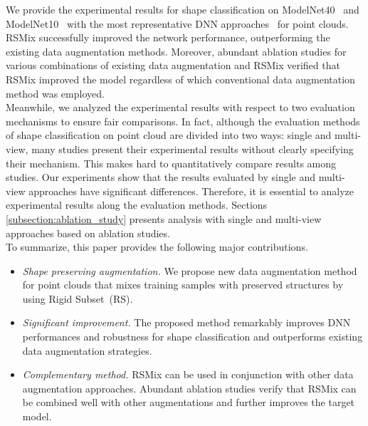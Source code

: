\documentclass[final]{cvpr}
\begin{document}
\indent We provide the experimental results for shape classification on ModelNet40~\cite{wu20153d} and ModelNet10~\cite{wu20153d} with the most representative DNN approaches~\cite{qi2017pointnet++,wang2019dynamic} for point clouds. RSMix successfully improved the network performance, outperforming the existing data augmentation methods. Moreover, abundant ablation studies for various combinations of existing data augmentation and RSMix verified that RSMix improved the model regardless of which conventional data augmentation method was employed.\\
\indent Meanwhile, we analyzed the experimental results with respect to two evaluation mechanisms to ensure fair comparisons. In fact, although the evaluation methods of shape classification on point cloud are divided into two ways: single and multi-view, many studies present their experimental results without clearly specifying their mechanism. This makes hard to quantitatively compare results among studies. Our experiments show that the results evaluated by single and multi-view approaches have significant differences. Therefore, it is essential to analyze experimental results along the evaluation methods. Sections \ref{subsection:ablation_study} presents analysis with single and multi-view approaches based on ablation studies.\\
\indent To summarize, this paper provides the following major contributions.
\begin{itemize}
	\item \textit{Shape preserving augmentation.} We propose new data augmentation method for point clouds that mixes training samples with preserved structures by using Rigid Subset~(RS). 
\item \textit{Significant improvement.} The proposed method remarkably improves DNN performances and robustness for shape classification and outperforms existing data augmentation strategies.
\item \textit{Complementary method.} RSMix can be used in conjunction with other data augmentation approaches. Abundant ablation studies verify that RSMix can be combined well with other augmentations and further improves the target model.
\end{itemize}
\end{document}
